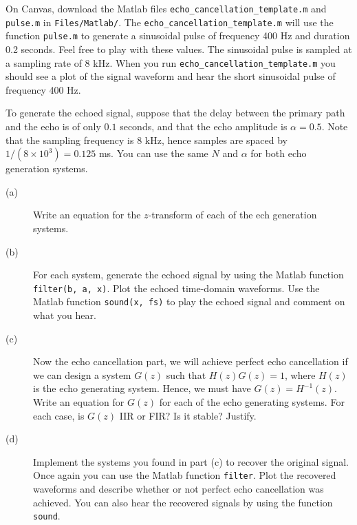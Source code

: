 \documentclass[12pt]{report}
\begin{document}
On Canvas, download the Matlab files \texttt{echo\_cancellation\_template.m} and \texttt{pulse.m} in \texttt{Files/Matlab/}. The \texttt{echo\_cancellation\_template.m} will use the function \texttt{pulse.m} to generate a sinusoidal pulse of frequency 400 Hz and duration 0.2 seconds. Feel free to play with these values. The sinusoidal pulse is sampled at a sampling rate of 8 kHz. When you run \texttt{echo\_cancellation\_template.m} you should see a plot of the signal waveform and hear the short sinusoidal pulse of frequency 400 Hz.

To generate the echoed signal, suppose that the delay between the primary path and the echo is of only $0.1$ seconds, and that the echo amplitude is $\alpha = 0.5$. Note that the sampling frequency is 8 kHz, hence samples are spaced by $1/(8\times 10^3) = 0.125$ ms. You can use the same $N$ and $\alpha$ for both echo generation systems.

\begin{description}
	\item[(a)] Write an equation for the $z$-transform of each of the ech generation systems.
	\item[(b)] For each system, generate the echoed signal by using the Matlab function \texttt{filter(b, a, x)}. Plot the echoed time-domain waveforms. Use the Matlab function \texttt{sound(x, fs)} to play the echoed signal and comment on what you hear.
	\item[(c)] Now the echo cancellation part, we will achieve perfect echo cancellation if we can design a system $G(z)$ such that $H(z)G(z) = 1$, where $H(z)$ is the echo generating system. Hence, we must have $G(z) = H^{-1}(z)$. Write an equation for $G(z)$ for each of the echo generating systems. For each case, is $G(z)$ IIR or FIR? Is it stable? Justify.
	\item [(d)] Implement the systems you found in part (c) to recover the original signal. Once again you can use the Matlab function \texttt{filter}. Plot the recovered waveforms and describe whether or not perfect echo cancellation was achieved. You can also hear the recovered signals by using the function \texttt{sound}.
\end{description}
\end{document}

